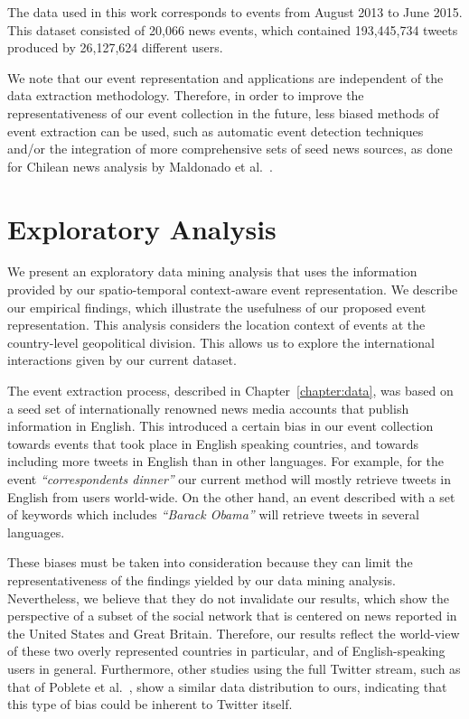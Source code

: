 

%
The data used in this work corresponds to events from August 2013 to June 2015.
%
This dataset consisted of 20,066 news events, which contained 193,445,734 tweets
produced by 26,127,624 different users.

We note that our event representation and applications are independent of the
data extraction methodology.  
%
Therefore, in order to improve the representativeness of our event collection in
the future, less biased methods of event extraction can be used, such as
automatic event detection techniques~\cite{Metzler_2012, Choi_2012} and/or the
integration of more comprehensive sets of seed news sources, as done for Chilean
news analysis by Maldonado et al.~\cite{maldonado2015spatio}.


\section{Exploratory Analysis}\label{sec:geo:mining}

We present an exploratory data mining analysis that uses the information
provided by our spatio-temporal context-aware event representation.  
%
We describe our empirical findings, which illustrate the usefulness of our
proposed event representation.  
%
This analysis considers the location context of events at the country-level
geopolitical division.  
%
This allows us to explore the international interactions given by our current
dataset. 


The event extraction process, described in Chapter~\ref{chapter:data}, was based
on a seed set of internationally renowned news media accounts that publish
information in English. 
%
This introduced a certain bias in our event collection towards events that took
place in English speaking countries, and towards including more tweets in
English than in other languages. 
%
For example, for the event {\it ``correspondents dinner''} our current method
will mostly retrieve tweets in English from users world-wide. 
%
On the other hand, an event described with a set of keywords which includes {\it
``Barack Obama''} will retrieve tweets in several languages. 


These biases must be taken into consideration because they can limit the
representativeness of the findings yielded by our data mining analysis.
%
Nevertheless, we believe that they do not invalidate our results, which show the
perspective of a subset of the social network that is centered on news reported
in the United States and Great Britain. 
%
Therefore, our results reflect the world-view of these two overly represented
countries in particular, and of English-speaking users in general.
%
Furthermore, other studies using the full Twitter stream, such as that of
Poblete et al.~\cite{Poblete:2011:BTS:2063576.2063724}, show a similar data
distribution to ours, indicating that this type of bias could be inherent to
Twitter itself.

